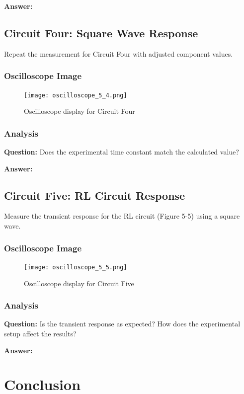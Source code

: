 \documentclass[12pt]{article}
\begin{document}
\textbf{Answer:} \\

\subsection{Circuit Four: Square Wave Response}
Repeat the measurement for Circuit Four with adjusted component values.

\subsubsection{Oscilloscope Image}
\begin{figure}[H]
	\centering
	\texttt{[image: oscilloscope\_5\_4.png]}
	\caption{Oscilloscope display for Circuit Four}
\end{figure}

\subsubsection{Analysis}
\textbf{Question:} Does the experimental time constant match the calculated value?

\textbf{Answer:} \\

\subsection{Circuit Five: RL Circuit Response}
Measure the transient response for the RL circuit (Figure 5-5) using a square wave.

\subsubsection{Oscilloscope Image}
\begin{figure}[H]
	\centering
	\texttt{[image: oscilloscope\_5\_5.png]}
	\caption{Oscilloscope display for Circuit Five}
\end{figure}

\subsubsection{Analysis}
\textbf{Question:} Is the transient response as expected? How does the experimental setup affect the results?

\textbf{Answer:} \\

\section{Conclusion}
\end{document}
